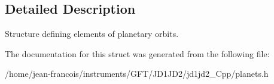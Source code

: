 \subsection{Detailed Description}
Structure defining elements of planetary orbits. 

The documentation for this struct was generated from the following file\-:\begin{DoxyCompactItemize}
\item 
/home/jean-\/francois/instruments/\-G\-F\-T/\-J\-D1\-J\-D2/jd1jd2\-\_\-\-Cpp/planets.\-h\end{DoxyCompactItemize}
